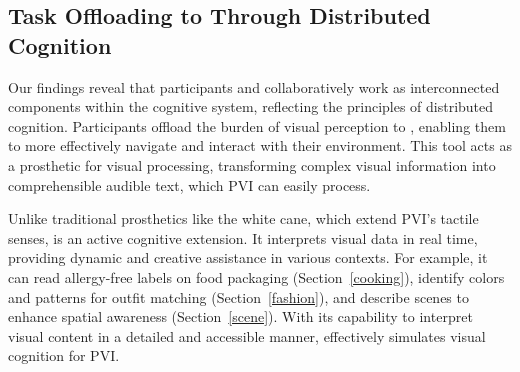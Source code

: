 \subsection{Task Offloading to \bma{} Through Distributed Cognition}









Our findings reveal that participants and \bma{} collaboratively work as interconnected components within the cognitive system, reflecting the principles of distributed cognition. Participants offload the burden of visual perception to \bma, enabling them to more effectively navigate and interact with their environment. This tool acts as a prosthetic for visual processing, transforming complex visual information into comprehensible audible text, which PVI can easily process. 


Unlike traditional prosthetics like the white cane, which extend PVI’s tactile senses, \bma{} is an active cognitive extension. It interprets visual data in real time, providing dynamic and creative assistance in various contexts. 
For example, it can read allergy-free labels on food packaging (Section~\ref{cooking}), identify colors and patterns for outfit matching (Section~\ref{fashion}), and describe scenes to enhance spatial awareness (Section~\ref{scene}). 
With its capability to interpret visual content in a detailed and accessible manner, \bma{} effectively simulates visual cognition for PVI.





